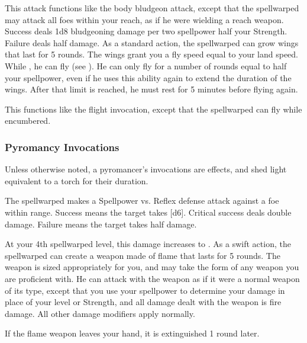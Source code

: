             This attack functions like the body bludgeon attack, except that the spellwarped may attack all foes within your reach, as if he were wielding a reach weapon.
            Success deals 1d8 bludgeoning damage per two spellpower \add half your Strength.
            Failure deals half damage.
            As a standard action, the spellwarped can grow wings that last for 5 rounds.
            The wings grant you a fly speed equal to your land speed.
            While \unencumbered, he can fly (see ).
            He can only fly for a number of rounds equal to half your spellpower, even if he uses this ability again to extend the duration of the wings.
            After that limit is reached, he must rest for 5 minutes before flying again.

            This functions like the flight invocation, except that the spellwarped can fly while encumbered.

        \subsubsection{Pyromancy Invocations}
            Unless otherwise noted, a pyromancer's invocations are  effects, and shed light equivalent to a torch for their duration.

            The spellwarped makes a Spellpower vs. Reflex defense attack against a foe within \rngmed range.
            Success means the target takes [d6].
            Critical success deals double damage.
            Failure means the target takes half damage.
            \par At your 4th spellwarped level, this damage increases to .
            As a swift action, the spellwarped can create a weapon made of flame that lasts for 5 rounds.
            The weapon is sized appropriately for you, and may take the form of any weapon you are proficient with.
            He can attack with the weapon as if it were a normal weapon of its type, except that you use your spellpower to determine your damage in place of your level or Strength, and all damage dealt with the weapon is fire damage.
            All other damage modifiers apply normally.
            \par If the flame weapon leaves your hand, it is extinguished 1 round later.

